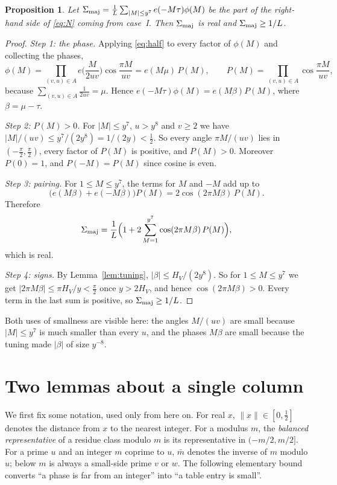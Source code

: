 \documentclass[11pt]{amsart}
\newtheorem{proposition}[theorem]{Proposition}
\theoremstyle{definition}
\theoremstyle{remark}
\newcommand{\nint}[1]{\lVert #1\rVert}
\begin{document}
\begin{proposition}\label{prop:major}
Let $\Sigma_{\rm maj}=\frac1L\sum_{|M|\le y^7}e(-M\tau)\phi(M)$ be the part of the right-hand side of \eqref{eq:N} coming from case~I. Then $\Sigma_{\rm maj}$ is real and $\Sigma_{\rm maj}\ge1/L$.
\end{proposition}
\begin{proof}
\emph{Step 1: the phase.} Applying \eqref{eq:half} to every factor of $\phi(M)$ and collecting the phases,
\[
 \phi(M)=\prod_{(v,u)\in A}e\Big(\frac M{2uv}\Big)\cos\frac{\pi M}{uv}=e(M\mu)\,P(M),\qquad P(M)=\prod_{(v,u)\in A}\cos\frac{\pi M}{uv},
\]
because $\sum_{(v,u)\in A}\frac1{2uv}=\mu$. Hence $e(-M\tau)\phi(M)=e(M\beta)P(M)$, where $\beta=\mu-\tau$.

\emph{Step 2: $P(M)>0$.} For $|M|\le y^7$, $u>y^8$ and $v\ge2$ we have $|M|/(uv)\le y^7/(2y^8)=1/(2y)<\frac12$. So every angle $\pi M/(uv)$ lies in $(-\frac\pi2,\frac\pi2)$, every factor of $P(M)$ is positive, and $P(M)>0$. Moreover $P(0)=1$, and $P(-M)=P(M)$ since cosine is even.

\emph{Step 3: pairing.} For $1\le M\le y^7$, the terms for $M$ and $-M$ add up to
\[
 \big(e(M\beta)+e(-M\beta)\big)P(M)=2\cos(2\pi M\beta)\,P(M).
\]
Therefore
\[
 \Sigma_{\rm maj}=\frac1L\Big(1+2\sum_{M=1}^{y^7}\cos(2\pi M\beta)\,P(M)\Big),
\]
which is real.

\emph{Step 4: signs.} By Lemma~\ref{lem:tuning}, $|\beta|\le H_V/(2y^8)$. So for $1\le M\le y^7$ we get $|2\pi M\beta|\le\pi H_V/y<\frac\pi2$ once $y>2H_V$, and hence $\cos(2\pi M\beta)>0$. Every term in the last sum is positive, so $\Sigma_{\rm maj}\ge1/L$.
\end{proof}

Both uses of smallness are visible here: the angles $M/(uv)$ are small because $|M|\le y^7$ is much smaller than every $u$, and the phases $M\beta$ are small because the tuning made $|\beta|$ of size $y^{-8}$.

\section{Two lemmas about a single column}\label{sec:tools}

We first fix some notation, used only from here on. For real $x$, $\nint{x}\in[0,\frac12]$ denotes the distance from $x$ to the nearest integer. For a modulus $m$, the \emph{balanced representative} of a residue class modulo $m$ is its representative in $(-m/2,m/2]$. For a prime $u$ and an integer $m$ coprime to $u$, $\bar m$ denotes the inverse of $m$ modulo $u$; below $m$ is always a small-side prime $v$ or $w$. The following elementary bound converts ``a phase is far from an integer'' into ``a table entry is small''.
\end{document}
